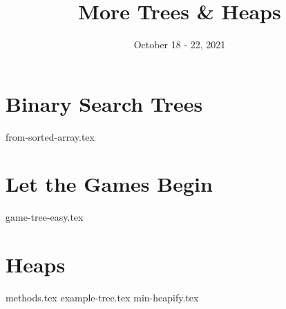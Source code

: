 \documentclass[11pt]{exam}
\title{More Trees \& Heaps}
\date{October 18 - 22, 2021}
\begin{document}
\maketitle

\section{Binary Search Trees}
\begin{questions}
{from-sorted-array.tex}
\end{questions}
\clearpage

\section{Let the Games Begin}
\begin{questions}
{game-tree-easy.tex}
\end{questions}
\clearpage

\section{Heaps}

\begin{questions}
{methods.tex}
{example-tree.tex}
{min-heapify.tex}
\end{questions}

\clearpage
\end{document}
